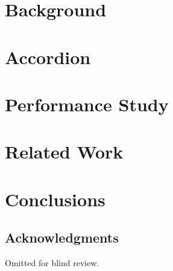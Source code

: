 \documentclass[letterpaper,twocolumn,10pt]{article}
\newcommand{\sys}{Accordion}
\begin{document}
\section{Background} \label{sec:background}
 

\section{\sys} \label{sec:accordion}
 

\section{Performance Study} \label{sec:eval}


\section{Related Work} \label{sec:related}

\section{Conclusions} \label{sec:conclusions}


\subsection*{Acknowledgments}
Omitted for blind review.

\newpage




\end{document}
